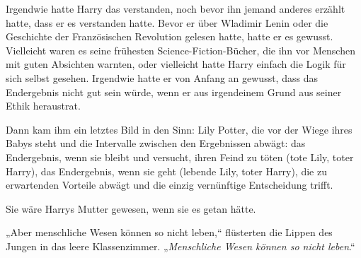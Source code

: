 Irgendwie hatte Harry das verstanden, noch bevor ihn jemand anderes erzählt hatte, dass er es verstanden hatte. Bevor er über Wladimir Lenin oder die Geschichte der Französischen Revolution gelesen hatte, hatte er es gewusst. Vielleicht waren es seine frühesten Science-Fiction-Bücher, die ihn vor Menschen mit guten Absichten warnten, oder vielleicht hatte Harry einfach die Logik für sich selbst gesehen. Irgendwie hatte er von Anfang an gewusst, dass das Endergebnis nicht gut sein würde, wenn er aus irgendeinem Grund aus seiner Ethik heraustrat.

Dann kam ihm ein letztes Bild in den Sinn: Lily Potter, die vor der Wiege ihres Babys steht und die Intervalle zwischen den Ergebnissen abwägt: das Endergebnis, wenn sie bleibt und versucht, ihren Feind zu töten (tote Lily, toter Harry), das Endergebnis, wenn sie geht (lebende Lily, toter Harry), die zu erwartenden Vorteile abwägt und die einzig vernünftige Entscheidung trifft.

Sie wäre Harrys Mutter gewesen, wenn sie es getan hätte.

„Aber menschliche Wesen können so nicht leben,“ flüsterten die Lippen des Jungen in das leere Klassenzimmer. „\emph{Menschliche Wesen können so nicht leben}.“

